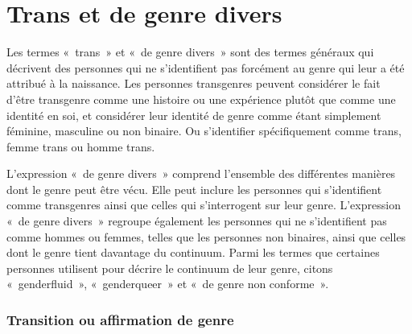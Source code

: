 \documentclass[12pt,openany]{book}
\begin{document}
\section*{Trans et de genre divers}

\noindent Les termes \mbox{« trans »} et \mbox{« d}e genre diver\mbox{s »} sont des termes généraux qui décrivent des personnes qui ne s’identifient pas forcément au genre qui leur a été attribué à la naissance. Les personnes transgenres peuvent considérer le fait d’être transgenre comme une histoire ou une expérience plutôt que comme une identité en soi, et considérer leur identité de genre comme étant simplement féminine, masculine ou non binaire. Ou s’identifier spécifiquement comme trans, femme trans ou homme trans.

L’expression \mbox{« d}e genre diver\mbox{s »} comprend l’ensemble des différentes manières dont le genre peut être vécu. Elle peut inclure les personnes qui s’identifient comme transgenres ainsi que celles qui s’interrogent sur leur genre. L’expression \mbox{« d}e genre diver\mbox{s »} regroupe également les personnes qui ne s’identifient pas comme hommes ou femmes, telles que les personnes non binaires, ainsi que celles dont le genre tient davantage du continuum. Parmi les termes que certaines personnes utilisent pour décrire le continuum de leur genre, citons \mbox{« genderfluid »}, \mbox{« genderqueer »} et \mbox{« d}e genre non conform\mbox{e »}.

\begin{figure}[h]
    \centering
\end{figure}

\subsubsection*{Transition ou affirmation de genre}
\end{document}
